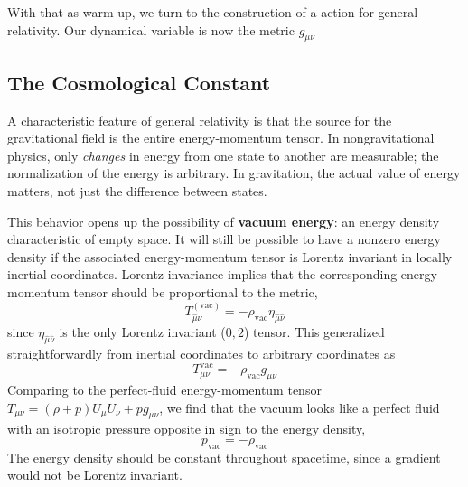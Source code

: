 With that as warm-up, we turn to the construction of a action for general relativity. Our dynamical variable is now the metric $g_{\mu\nu}$


\subsection{The Cosmological Constant}
A characteristic feature of general relativity is that the source for the gravitational field is the entire energy-momentum tensor. In nongravitational physics, only \textit{changes} in energy from one state to another are measurable; the normalization of the energy is arbitrary. In gravitation, the actual value of energy matters, not just the difference between states.

This behavior opens up the possibility of \textbf{vacuum energy}: an energy density characteristic of empty space. It will still be possible to have a nonzero energy density if the associated energy-momentum tensor is Lorentz invariant in locally inertial coordinates. Lorentz invariance implies that the corresponding energy-momentum tensor should be proportional to the metric,
\begin{equation*}
    T_{\hat{\mu}\hat{\nu}}^{(\text{vac})}=-\rho_{\text{vac}} \eta_{\hat{\mu}\hat{\nu}}
\end{equation*}
since $ \eta_{\hat{\mu}\hat{\nu}}$ is the only Lorentz invariant ($0,2$) tensor. This generalized straightforwardly from inertial coordinates to arbitrary coordinates as
\begin{equation*}
    T_{\mu\nu}^{\text{vac}}=-\rho_{\text{vac}}g_{\mu\nu}
\end{equation*}
Comparing to the perfect-fluid energy-momentum tensor $T_{\mu\nu}=(\rho +p)U_\mu U_\nu +pg_{\mu\nu}$, we find that the vacuum looks like a perfect fluid with an isotropic pressure opposite in sign to the energy density,
\begin{equation*}
    p_{\text{vac}}=-\rho_{\text{vac}}
\end{equation*}
The energy density should be constant throughout spacetime, since a gradient would not be Lorentz invariant.

